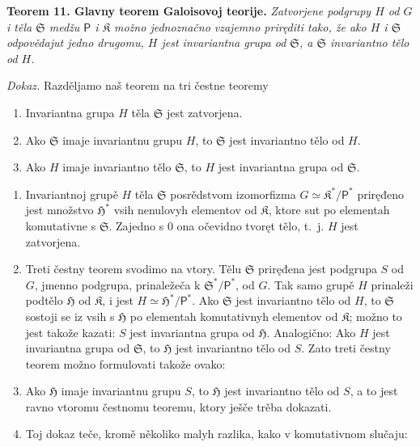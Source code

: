 \documentclass[11pt]{article}
\begin{document}
\textbf{Teorem 11. Glavny teorem Galoisovoj teorije.} \emph{Zatvorjene podgrupy \(H\) od \(G\) i těla \(\mathfrak S\) medžu \(\mathsf P\) i \(\mathfrak K\) možno jednoznačno vzajemno priręditi tako, že ako \(H\) i \(\mathfrak S\) odpovědajut jedno drugomu, \(H\) jest invariantna grupa od \(\mathfrak S\), a \(\mathfrak S\) invariantno tělo od \(H\).}

\emph{Dokaz.} Razděljamo naš teorem na tri čestne teoremy
\begin{enumerate}
\item Invariantna grupa \(H\) těla \(\mathfrak S\) jest zatvorjena.
\item Ako \(\mathfrak S\) imaje invariantnu grupu \(H\), to \(\mathfrak S\) jest invariantno tělo od \(H\).
\item Ako \(H\) imaje invariantno tělo \(\mathfrak S\), to \(H\) jest invariantna grupa od \(\mathfrak S\).
\end{enumerate}

\begin{enumerate}
\item Invariantnoj grupě \(H\) těla \(\mathfrak S\) posrědstvom izomorfizma \(G\simeq \mathfrak K^*/\mathsf P^*\) priręđeno jest množstvo \(\mathfrak H^*\) vsih nenulovyh elementov od \(\mathfrak K\), ktore sut po elementah komutativne s \(\mathfrak S\). Zajedno s 0 ona očevidno tvoręt tělo, t.~j. \(H\) jest zatvorjena.

\item Treti čestny teorem svodimo na vtory. Tělu \(\mathfrak S\) priręđena jest podgrupa \(S\) od \(G\), jmenno podgrupa, prinaležeča k \(\mathfrak S^*/\mathsf P^*\), od \(G\). Tak samo grupě \(H\) prinaleži podtělo \(\mathfrak H\) od \(\mathfrak K\), i jest \(H\simeq \mathfrak H^*/\mathsf P^*\). Ako \(\mathfrak S\) jest invariantno tělo od \(H\), to \(\mathfrak S\) sostoji se iz vsih s \(\mathfrak H\) po elementah komutativnyh elementov od \(\mathfrak K\); možno to jest takože kazati: \(S\) jest invariantna grupa od \(\mathfrak H\). Analogično: Ako \(H\) jest invariantna grupa od \(\mathfrak S\), to \(\mathfrak H\) jest invariantno tělo od \(S\). Zato treti čestny teorem možno formulovati takože ovako:

\item[\(3'\).] Ako \(\mathfrak H\) imaje invariantnu grupu \(S\), to \(\mathfrak H\) jest invariantno tělo od \(S\), a to jest ravno vtoromu čestnomu teoremu, ktory ješče trěba dokazati.

\item[3.] Toj dokaz teče, kromě několiko malyh razlika, kako v komutativnom slučaju:
\end{enumerate}
\end{document}
